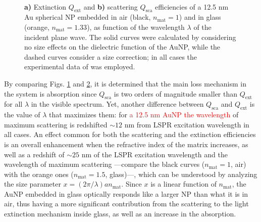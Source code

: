 \begin{figure}[h!]
	\def\svgwidth{1\textwidth} \small
  \vspace*{3.0em}
  \hspace*{-.25\textwidth}
    \begin{subfigure}{.51\textwidth}\caption{ }\label{fig:Mieefficiencies:a}\end{subfigure}
    \begin{subfigure}{.49\textwidth}\caption{ }\label{fig:Mieefficiencies:b}\end{subfigure}
  \vspace*{-6.em}\\
  \vspace*{-2em}
  \caption[Extinction and Scattering Efficiency of a 12.5 nm Au Spherical NP embedded in Air and Glass]{ \textbf{a)} Extinction $Q_\text{ext}$ and \textbf{b)} scattering $Q_\text{sca}$ efficiencies of a 12.5 nm Au spherical NP embedded in air (black, $n_\text{mat} = 1$)  and in glass (orange, $n_\text{mat} = 1.33$), as function of the wavelength $\lambda$ of the incident plane wave.  The solid curves were calculated by considering no size effects on the dielectric function of the AuNP, while the dashed curves consider a size correction; in all cases the experimental data of \citeauthor{johnson_optical_1972} \cite{johnson_optical_1972} was employed.}
\label{fig:Mieefficiencies}
\end{figure}

By comparing Figs. \ref{fig:Mieefficiencies:a} and \ref{fig:Mieefficiencies:b}, it is determined that the main loss mechanism in the system is absorption since $Q_\text{sca}$ is two orders of magnitude smaller than $Q_\text{ext}$ for all $\lambda$ in the visible spectrum. Yet, another difference between  $Q_\text{sca}$ and  $Q_\text{ext}$ is the value of $\lambda$ that maximizes them: for \textcolor{red}{a 12.5 nm AuNP the wavelength} of maximum scattering is redshifted $\sim 12$ nm from  LSPR excitation wavelength in all cases. An effect common for both the scattering and the extinction efficiencies is an overall enhancement  when the refractive index of the matrix increases, as well as a redshift of $\sim 25$ nm of the LSPR excitation wavelength and the wavelength of maximum scattering ---compare the black curves ($n_\text{mat} = 1$, air) with the orange ones ($n_\text{mat} = 1.5$, glass)---, which can be understood by analyzing the size parameter $ x = (2 \pi / \lambda ) a n_\text{mat} $. Since $x$ is a linear function of $n_\text{mat}$, the AuNP embedded in glass optically responds like a larger NP than what it is in air, thus having a more significant contribution from the scattering to the light extinction mechanism inside glass, as well as an increase in the absorption.


